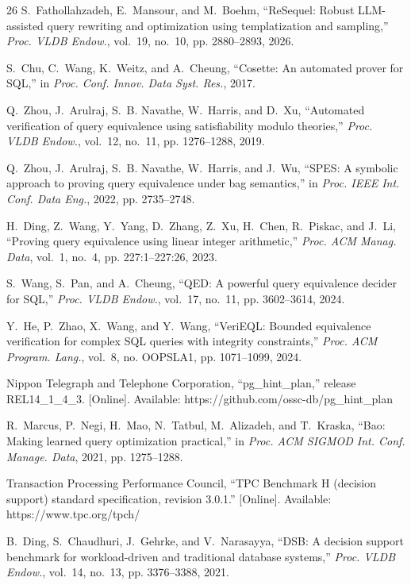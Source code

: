 \documentclass[conference]{IEEEtran}
\begin{document}
\begin{thebibliography}{26}
S.~Fathollahzadeh, E.~Mansour, and M.~Boehm, ``ReSequel: Robust LLM-assisted query rewriting and optimization using templatization and sampling,'' \emph{Proc. VLDB Endow.}, vol.~19, no.~10, pp. 2880--2893, 2026.

S.~Chu, C.~Wang, K.~Weitz, and A.~Cheung, ``Cosette: An automated prover for SQL,'' in \emph{Proc. Conf. Innov. Data Syst. Res.}, 2017.

Q.~Zhou, J.~Arulraj, S.~B. Navathe, W.~Harris, and D.~Xu, ``Automated verification of query equivalence using satisfiability modulo theories,'' \emph{Proc. VLDB Endow.}, vol.~12, no.~11, pp. 1276--1288, 2019.

Q.~Zhou, J.~Arulraj, S.~B. Navathe, W.~Harris, and J.~Wu, ``SPES: A symbolic approach to proving query equivalence under bag semantics,'' in \emph{Proc. IEEE Int. Conf. Data Eng.}, 2022, pp. 2735--2748.

H.~Ding, Z.~Wang, Y.~Yang, D.~Zhang, Z.~Xu, H.~Chen, R.~Piskac, and J.~Li, ``Proving query equivalence using linear integer arithmetic,'' \emph{Proc. ACM Manag. Data}, vol.~1, no.~4, pp. 227:1--227:26, 2023.

S.~Wang, S.~Pan, and A.~Cheung, ``QED: A powerful query equivalence decider for SQL,'' \emph{Proc. VLDB Endow.}, vol.~17, no.~11, pp. 3602--3614, 2024.

Y.~He, P.~Zhao, X.~Wang, and Y.~Wang, ``VeriEQL: Bounded equivalence verification for complex SQL queries with integrity constraints,'' \emph{Proc. ACM Program. Lang.}, vol.~8, no. OOPSLA1, pp. 1071--1099, 2024.

Nippon Telegraph and Telephone Corporation, ``pg\_hint\_plan,'' release REL14\_1\_4\_3. [Online]. Available: https://github.com/ossc-db/pg\_hint\_plan

R.~Marcus, P.~Negi, H.~Mao, N.~Tatbul, M.~Alizadeh, and T.~Kraska, ``Bao: Making learned query optimization practical,'' in \emph{Proc. ACM SIGMOD Int. Conf. Manage. Data}, 2021, pp. 1275--1288.

Transaction Processing Performance Council, ``TPC Benchmark H (decision support) standard specification, revision 3.0.1.'' [Online]. Available: https://www.tpc.org/tpch/

B.~Ding, S.~Chaudhuri, J.~Gehrke, and V.~Narasayya, ``DSB: A decision support benchmark for workload-driven and traditional database systems,'' \emph{Proc. VLDB Endow.}, vol.~14, no.~13, pp. 3376--3388, 2021.


\end{thebibliography}
\end{document}
